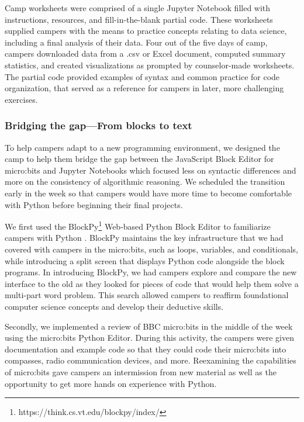 Camp worksheets were comprised of a single Jupyter Notebook filled
with instructions, resources, and fill-in-the-blank partial code.
These worksheets supplied campers with the means to practice concepts
relating to data science, including a final analysis of their data.
Four out of the five days of camp, campers downloaded data from a
.csv or Excel document, computed summary statistics, and created
visualizations as prompted by counselor-made worksheets. The partial
code provided examples of syntax and common practice for code
organization, that served as a reference for campers in later, more
challenging exercises.

\subsubsection{Bridging the gap---From blocks to text}

To help campers adapt to a new programming environment, we designed
the camp to help them bridge the gap between the JavaScript Block
Editor for micro:bits and Jupyter Notebooks which focused less on
syntactic differences and more on the consistency of algorithmic
reasoning.  We scheduled the transition early in the week so that
campers would have more time to become comfortable with Python
before beginning their final projects.

We first used the BlockPy\footnote{https://think.cs.vt.edu/blockpy/index/}
Web-based Python Block Editor to familiarize campers with Python
\cite{Bart2017}.  BlockPy maintains the key infrastructure that we
had covered with campers in the micro:bits, such as loops, variables,
and conditionals, while introducing a split screen that displays
Python code alongside the block programs. In introducing BlockPy,
we had campers explore and compare the new interface to the old as
they looked for pieces of code that would help them solve a multi-part
word problem. This search allowed campers to reaffirm foundational
computer science concepts and develop their deductive skills.

Secondly, we implemented a review of BBC micro:bits in the middle
of the week using the micro:bits Python Editor. During this activity,
the campers were given documentation and example code so that they
could code their micro:bits into compasses, radio communication
devices, and more. Reexamining the capabilities of micro:bits gave
campers an intermission from new material as well as the opportunity
to get more hands on experience with Python.

